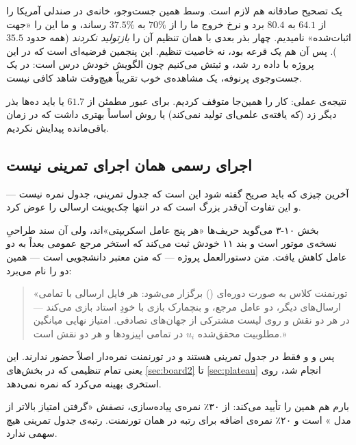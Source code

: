 \documentclass[12pt,a4paper]{article}
\begin{document}
یک تصحیح صادقانه هم لازم است. وسط همین جست‌وجو،  خانه‌ی
 در صندلی آمریکا را از $64.1$ به $80.4$ برد و نرخ خروج ما را
از $70\%$ به $37.5\%$ رساند، و ما این را «جهت اثبات‌شده» نامیدیم. چهار
بذر بعدی با همان تنظیم آن را \emph{بازتولید نکردند} (همه حدود $35.5$).
پس آن هم یک قرعه بود، نه خاصیت تنظیم. این پنجمین فرضیه‌ای است که در این
پروژه با داده رد شد، و ثبتش می‌کنیم چون الگویش خودش درس است: در یک
جست‌وجوی پرنوفه، یک مشاهده‌ی خوب تقریباً هیچ‌وقت شاهد کافی نیست.

نتیجه‌ی عملی: کار را همین‌جا متوقف کردیم. برای عبور مطمئن از $61.7$ یا
باید ده‌ها بذر دیگر زد (که یافته‌ی علمی‌ای تولید نمی‌کند) یا روش
اساساً بهتری داشت که در زمان باقی‌مانده پیدایش نکردیم.

\subsection{اجرای رسمی همان اجرای تمرینی نیست}
\label{sec:official}

آخرین چیزی که باید صریح گفته شود این است که جدول تمرینی، جدول نمره نیست —
و این تفاوت آن‌قدر بزرگ است که در انتها چک‌پوینت ارسالی را عوض کرد.

 بخش ۱۰-۳ می‌گوید حریف‌ها «هر پنج عامل اسکریپتی»اند، ولی
آن سند طراحیِ نسخه‌ی  موتور است و بند ۱۱ خودش ثبت می‌کند که استخر مرجع
عمومی بعداً به دو عامل کاهش یافت. متن دستورالعمل پروژه — که متن
معتبر دانشجویی است — همین دو را نام می‌برد:

\begin{quote}\small
«تورنمنت کلاس به صورت دوره‌ای () برگزار می‌شود: هر فایل
ارسالی با تمامی ارسال‌های دیگر، دو عامل مرجع، و بنچمارک بازی با خودِ استاد
بازی می‌کند — در هر دو نقش و روی لیست مشترکی از جهان‌های تصادفی. امتیاز
نهایی میانگین مطلوبیت محقق‌شده $u_i$ در تمامی اپیزودها و هر دو نقش است.»
\end{quote}

پس  و  و  فقط در جدول تمرینی
هستند و در تورنمنت نمره‌دار اصلاً حضور ندارند. این یعنی تمام تنظیمی که در
بخش‌های \ref{sec:board2} تا \ref{sec:plateau} انجام شد، روی استخری بهینه
می‌کرد که نمره نمی‌دهد.

بارم هم همین را تأیید می‌کند: از ۳۰٪ نمره‌ی پیاده‌سازی، نصفش «گرفتن امتیاز
بالاتر از مدل » است و ۲۰٪ نمره‌ی اضافه برای رتبه در همان
تورنمنت. رتبه‌ی جدول تمرینی هیچ سهمی ندارد.
\end{document}
